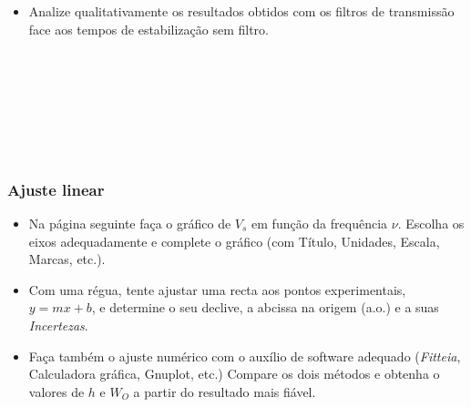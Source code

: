 \documentclass[a4paper,12pt]{article}  %
\def\width{18}
\def\hauteur{24}
\begin{document}
\begin{itemize}
\item Analize qualitativamente os resultados obtidos com os filtros de transmissão face aos tempos de estabilização sem filtro.
\end{itemize}

\noindent\underline{\makebox[\textwidth][r]{~}} \\
\noindent\underline{\makebox[\textwidth][r]{~}} \\
\noindent\underline{\makebox[\textwidth][r]{~}} \\
\noindent\underline{\makebox[\textwidth][r]{~}} \\
\noindent\underline{\makebox[\textwidth][r]{~}} \\
\noindent\underline{\makebox[\textwidth][r]{~}} \\
\noindent\underline{\makebox[\textwidth][r]{~}} 

\subsubsection{Ajuste linear}
\begin{itemize}
\item  Na página seguinte faça o gráfico de $V_s$ em função da frequência $\nu$. Escolha os eixos adequadamente e complete o gráfico (com Título, Unidades, Escala, Marcas, etc.). 
\item Com uma régua, tente  ajustar  uma recta aos pontos experimentais, $y=mx + b$, e determine o seu declive, a  abcissa na origem (a.o.) e a suas \emph{Incertezas}.
\item Faça também o ajuste numérico com o auxílio de software adequado (\emph{Fitteia}, Calculadora gráfica, Gnuplot, etc.) 
Compare os dois métodos e obtenha o valores de $h$ e $W_O$ a partir do resultado mais fiável.  
\end{itemize}



\end{document}
